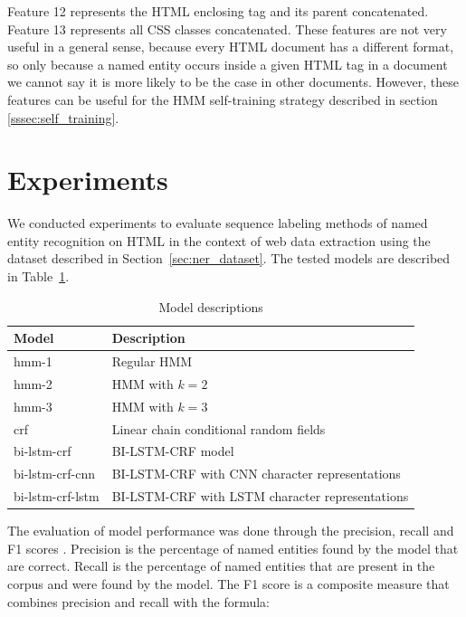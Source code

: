 \documentclass{nle}
\begin{document}
Feature 12 represents the HTML enclosing tag and its parent concatenated. Feature 13
represents all CSS classes concatenated. These features are not very useful in a general
sense, because every HTML document has a different format, so only because a named entity
occurs inside a given HTML tag in a document we cannot say it is more likely to be the case 
in other documents. However, these features can be useful for the HMM self-training strategy 
described in section \ref{sssec:self_training}. 

\section{Experiments}

We conducted experiments to evaluate sequence labeling methods of named entity 
recognition on HTML in the context of web data extraction using the dataset 
described in Section~\ref{sec:ner_dataset}. The tested models are described in
Table~\ref{tab:models}.

\begin{table}[h]
  \small
  \begin{center}
    \begin{tabular}{ ll }
      \toprule
      Model & Description \\
      \midrule
      hmm-1            & Regular HMM \\
      hmm-2            & HMM with $ k=2 $ \\
      hmm-3            & HMM with $ k=3 $ \\
      crf              & Linear chain conditional random fields \\
      bi-lstm-crf      & BI-LSTM-CRF model \cite{Huang2015} \\
      bi-lstm-crf-cnn  & BI-LSTM-CRF with CNN character representations \cite{Ma2016} \\
      bi-lstm-crf-lstm & BI-LSTM-CRF with LSTM character representations \cite{Lample2016} \\
      \bottomrule
    \end{tabular}
  \end{center}
  \caption{Model descriptions}
  \label{tab:models}
\end{table}

The evaluation of model performance was done through the precision, recall and 
F1 scores \cite{Rijsbergen1979}. Precision is the percentage of named entities found by 
the model that are correct. Recall is the percentage of named entities that are present
in the corpus and were found by the model. The F1 score is a composite measure that combines
precision and recall with the formula:
\end{document}
